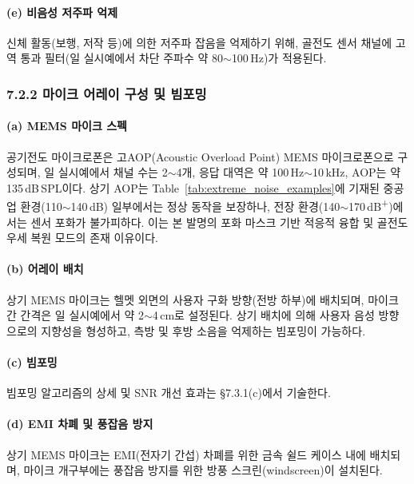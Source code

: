 \documentclass{article}
\begin{document}
\paragraph{(e) 비음성 저주파 억제}

신체 활동(보행, 저작 등)에 의한 저주파 잡음을 억제하기 위해, 골전도 센서 채널에 고역 통과 필터(일 실시예에서 차단 주파수 약 80$\sim$100\,Hz)가 적용된다.

\subsubsection{7.2.2 마이크 어레이 구성 및 빔포밍}

\paragraph{(a) MEMS 마이크 스펙}

공기전도 마이크로폰은 고AOP(Acoustic Overload Point) MEMS 마이크로폰으로 구성되며, 일 실시예에서 채널 수는 2$\sim$4개, 응답 대역은 약 100\,Hz$\sim$10\,kHz, AOP는 약 135\,dB\,SPL이다. 상기 AOP는 Table~\ref{tab:extreme_noise_examples}에 기재된 중공업 환경(110$\sim$140\,dB) 일부에서는 정상 동작을 보장하나, 전장 환경(140$\sim$170\,dB\textsuperscript{+})에서는 센서 포화가 불가피하다. 이는 본 발명의 포화 마스크 기반 적응적 융합 및 골전도 우세 복원 모드의 존재 이유이다.

\paragraph{(b) 어레이 배치}

상기 MEMS 마이크는 헬멧 외면의 사용자 구화 방향(전방 하부)에 배치되며, 마이크 간 간격은 일 실시예에서 약 2$\sim$4\,cm로 설정된다. 상기 배치에 의해 사용자 음성 방향으로의 지향성을 형성하고, 측방 및 후방 소음을 억제하는 빔포밍이 가능하다.

\paragraph{(c) 빔포밍}

빔포밍 알고리즘의 상세 및 SNR 개선 효과는 §7.3.1(c)에서 기술한다.

\paragraph{(d) EMI 차폐 및 풍잡음 방지}

상기 MEMS 마이크는 EMI(전자기 간섭) 차폐를 위한 금속 쉴드 케이스 내에 배치되며, 마이크 개구부에는 풍잡음 방지를 위한 방풍 스크린(windscreen)이 설치된다.
\end{document}
